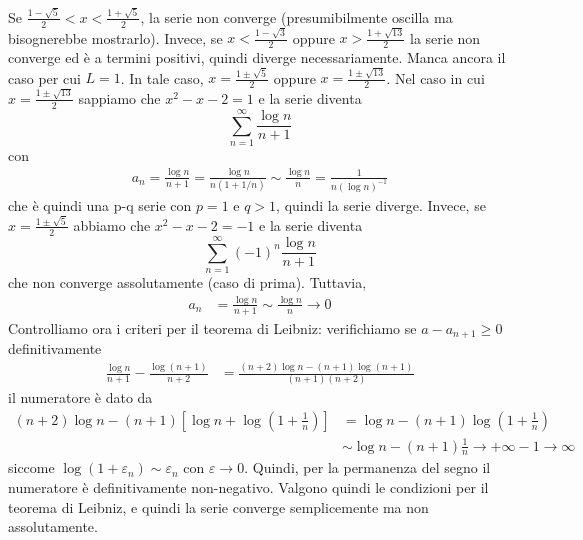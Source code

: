 \documentclass[a4paper]{article}
\begin{document}
\begin{snippetexample}{}
    Se \(\frac{1-\sqrt{5}}{2} < x < \frac{1 + \sqrt{5}}{2}\), la serie non converge (presumibilmente oscilla ma bisognerebbe mostrarlo).
    Invece, se \(x < \frac{1 - \sqrt{3}}{2}\) oppure \(x > \frac{1 + \sqrt{13}}{2}\) la serie non converge ed è a termini positivi,
    quindi diverge necessariamente.
    Manca ancora il caso per cui \(L=1\).
    In tale caso, \(x = \frac{1 \pm \sqrt{5}}{2}\) oppure \(x = \frac{1 \pm \sqrt{13}}{2}\).
    Nel caso in cui \(x = \frac{1 \pm \sqrt{13}}{2}\) sappiamo che \(x^2 - x - 2 = 1\)
    e la serie diventa
    \[
        \sum_{n=1}^\infty \frac{\log n}{n+1}
    \]
    con
    \begin{align*}
        a_n = \frac{\log n}{n+1} = \frac{\log n}{n(1 + 1/n)} \sim \frac{\log n}{n}
        = \frac{1}{n{(\log n)}^{-1}}
    \end{align*}
    che è quindi una p-q serie con \(p=1\) e \(q > 1\), quindi la serie diverge.
    Invece, se \(x = \frac{1 \pm \sqrt{5}}{2}\) abbiamo che \(x^2 - x - 2 = -1\)
    e la serie diventa
    \[
        \sum_{n=1}^\infty {(-1)}^n \frac{\log n}{n+1}
    \]
    che non converge assolutamente (caso di prima). Tuttavia,
    \begin{align*}
        a_n &= \frac{\log n}{n+1} \sim \frac{\log n}{n} \to 0
    \end{align*}
    Controlliamo ora i criteri per il teorema di Leibniz:
    verifichiamo se \(a-a_{n+1} \geq 0\) definitivamente
    \begin{align*}
        \frac{\log n}{n+1} - \frac{\log (n+1)}{n+2} &=
        \frac{(n+2)\log n - (n+1)\log (n+1)}{(n+1)(n+2)}
    \end{align*}
    il numeratore è dato da
    \begin{align*}
        (n+2)\log n - (n+1) \left[\log n + \log\left(1 + \frac{1}{n}\right)\right] &=
        \log n - (n+1)\log \left(1 + \frac{1}{n}\right) \\
        &\sim \log n - (n+1)\frac{1}{n} \to +\infty - 1 \to \infty
    \end{align*}
    siccome \(\log\left(1 + \varepsilon_n\right) \sim \varepsilon_n\) con \(\varepsilon \to 0\).
    Quindi, per la permanenza del segno il numeratore è definitivamente non-negativo.
    Valgono quindi le condizioni per il teorema di Leibniz, e quindi la serie
    converge semplicemente ma non assolutamente.
\end{snippetexample}
\end{document}
